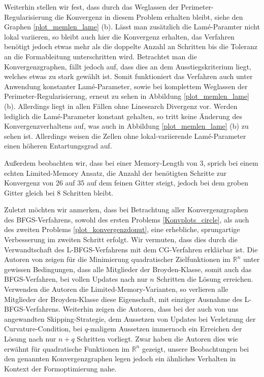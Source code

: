 Weiterhin stellen wir fest, dass durch das Weglassen der Perimeter-Regularisierung die Konvergenz in diesem Problem erhalten bleibt, siehe den Graphen \ref{plot_memlen_lame} (b). Lässt man zusätzlich die Lamé-Paramter nicht lokal variieren, so bleibt auch hier die Konvergenz erhalten, das Verfahren benötigt jedoch etwas mehr als die doppelte Anzahl an Schritten bis die Toleranz an die Formableitung unterschritten wird. Betrachtet man die Konvergenzgraphen, fällt jedoch auf, dass dies an dem Ausstiegskriterium liegt, welches etwas zu stark gewählt ist. Somit funktioniert das Verfahren auch unter Anwendung konstanter Lamé-Parameter, sowie bei komplettem Weglassen der Perimeter-Regularisierung, erneut zu sehen in Abbildung \ref{plot_memlen_lame} (b). Allerdings liegt in allen Fällen ohne Linesearch Divergenz vor. Werden lediglich die Lamé-Parameter konstant gehalten, so tritt keine Änderung des Konvergenzverhaltens auf, was auch in Abbildung \ref{plot_memlen_lame} (b) zu sehen ist. Allerdings weisen die Zellen ohne lokal-variierende Lamé-Parameter einen höheren Entartungsgrad auf.

Außerdem beobachten wir, dass bei einer Memory-Length von 3, sprich bei einem echten Limited-Memory Ansatz, die Anzahl der benötigten Schritte zur Konvergenz von 26 auf 35 auf dem feinen Gitter steigt, jedoch bei dem groben Gitter gleich bei 8 Schritten bleibt. 

Zuletzt möchten wir anmerken, dass bei Betrachtung aller Konvergenzgraphen des BFGS-Verfahrens, sowohl des ersten Problems \ref{Konvplots_circle}, als auch des zweiten Problems \ref{plot_konvergenzdonut}, eine erhebliche, sprungartige Verbesserung im zweiten Schritt erfolgt. Wir vermuten, dass dies durch die Verwandtschaft des L-BFGS-Verfahrens mit dem CG-Verfahren erklärbar ist. Die Autoren von \cite{bfgsjumpconv} zeigen für die Minimierung quadratischer Zielfunktionen im $\mathbb{R}^n$ unter gewissen Bedingungen, dass alle Mitglieder der Broyden-Klasse, somit auch das BFGS-Verfahren, bei vollen Updates nach nur $n$ Schritten die Lösung erreichen. Verwenden die Autoren die Limited-Memory-Varianten, so verlieren alle Mitglieder der Broyden-Klasse diese Eigenschaft, mit einziger Ausnahme des L-BFGS-Verfahrens. Weiterhin zeigen die Autoren, dass bei der auch von uns angewandten Skipping-Strategie, dem Aussetzen von Updates bei Verletzung der Curvature-Condition, bei $q$-maligem Aussetzen immernoch ein Erreichen der Lösung nach nur $n+q$ Schritten vorliegt. Zwar haben die Autoren dies wie erwähnt für quadratische Funktionen im $\mathbb{R}^n$ gezeigt, unsere Beobachtungen bei den genannten Konvergenzgraphen legen jedoch ein ähnliches Verhalten in Kontext der Formoptimierung nahe. 

